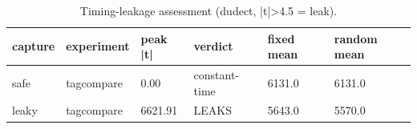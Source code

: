 \begin{table}[t]
  \centering
  \caption{Timing-leakage assessment (dudect, |t|>4.5 = leak).}
  \label{tab:timing}
  \begin{tabular}{llllll}
    \toprule
    capture & experiment & peak |t| & verdict & fixed mean & random mean \\
    \midrule
    safe & tagcompare & 0.00 & constant-time & 6131.0 & 6131.0 \\
    leaky & tagcompare & 6621.91 & LEAKS & 5643.0 & 5570.0 \\
    \bottomrule
  \end{tabular}
\end{table}
